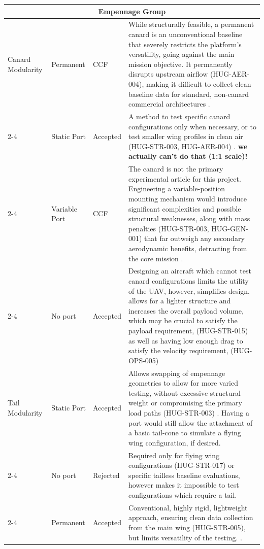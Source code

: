 \begin{longtable}{|p{1.6cm}|p{2.3cm}|p{1.6cm}|p{9.5cm}|}
\multicolumn{4}{|c|}{\textbf{Empennage Group}} \\
\hline
Canard Modularity & Permanent & CCF & While structurally feasible, a permanent canard is an unconventional baseline that severely restricts the platform's versatility, going against the main mission objective. It permanently disrupts upstream airflow (HUG-AER-004), making it difficult to collect clean baseline data for standard, non-canard commercial architectures \cite{raymer1992aircraft, lopes2005canard}. \\
\cline{2-4}
\multicolumn{1}{|l|}{} & Static Port & Accepted & A method to test specific canard configurations only when necessary, or to test smaller wing profiles in clean air (HUG-STR-003, HUG-AER-004) \cite{lopes2005canard}. \textbf{we actually can't do that (1:1 scale)!} \\
\cline{2-4}
\multicolumn{1}{|l|}{} & Variable Port & CCF & The canard is not the primary experimental article for this project. Engineering a variable-position mounting mechanism would introduce significant complexities and possible structural weaknesses, along with mass penalties (HUG-STR-003, HUG-GEN-001) that far outweigh any secondary aerodynamic benefits, detracting from the core mission \cite{raymer1992aircraft}. \\
\cline{2-4}
\multicolumn{1}{|l|}{} & No port & Accepted & Designing an aircraft which cannot test canard configurations limits the utility of the UAV, however, simplifies design, allows for a lighter structure and increases the overall payload volume, which may be crucial to satisfy the payload requirement, (HUG-STR-015) as well as having low enough drag to satisfy the velocity requirement, (HUG-OPS-005)  \\
\hline
Tail Modularity & Static Port & Accepted & Allows swapping of empennage geometries to allow for more varied testing, without excessive structural weight or compromising the primary load paths (HUG-STR-003) \cite{Vos}. Having a port would still allow the attachment of a basic tail-cone to simulate a flying wing configuration, if desired.\\
\cline{2-4}
\multicolumn{1}{|l|}{} & No port & Rejected & Required only for flying wing configurations (HUG-STR-017) or specific tailless baseline evaluations, however makes it impossible to test configurations which require a tail. \\
\cline{2-4}
\multicolumn{1}{|l|}{} & Permanent & Accepted & Conventional, highly rigid, lightweight approach, ensuring clean data collection from the main wing (HUG-STR-005), but limits versatility of the testing. \cite{livne}. \\

\end{longtable}
